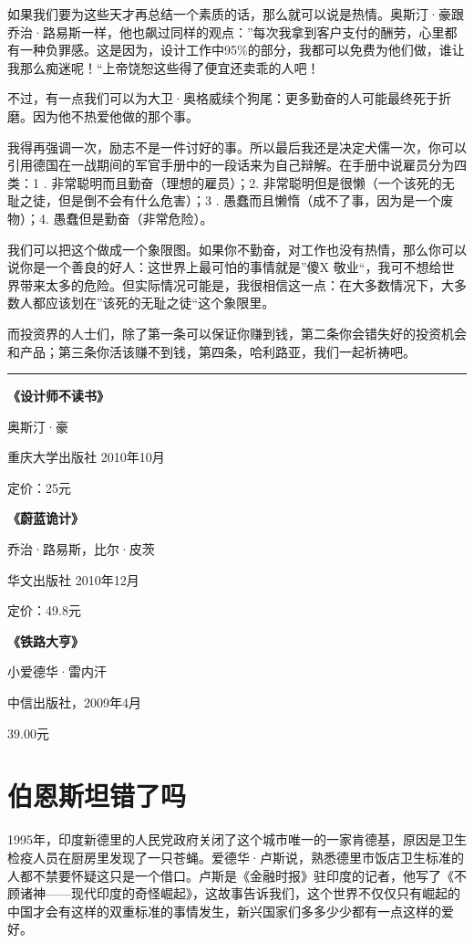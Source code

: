 如果我们要为这些天才再总结一个素质的话，那么就可以说是热情。奥斯汀·豪跟乔治·路易斯一样，他也飙过同样的观点：''每次我拿到客户支付的酬劳，心里都有一种负罪感。这是因为，设计工作中95\%的部分，我都可以免费为他们做，谁让我那么痴迷呢！``上帝饶恕这些得了便宜还卖乖的人吧！

不过，有一点我们可以为大卫·奥格威续个狗尾：更多勤奋的人可能最终死于折磨。因为他不热爱他做的那个事。

我得再强调一次，励志不是一件讨好的事。所以最后我还是决定犬儒一次，你可以引用德国在一战期间的军官手册中的一段话来为自己辩解。在手册中说雇员分为四类：1
. 非常聪明而且勤奋（理想的雇员）；2.
非常聪明但是很懒（一个该死的无耻之徒，但是倒不会有什么危害）；3 .
愚蠢而且懒惰（成不了事，因为是一个废物）；4. 愚蠢但是勤奋（非常危险）。

我们可以把这个做成一个象限图。如果你不勤奋，对工作也没有热情，那么你可以说你是一个善良的好人：这世界上最可怕的事情就是''傻X
敬业``，我可不想给世界带来太多的危险。但实际情况可能是，我很相信这一点：在大多数情况下，大多数人都应该划在''该死的无耻之徒``这个象限里。

而投资界的人士们，除了第一条可以保证你赚到钱，第二条你会错失好的投资机会和产品；第三条你活该赚不到钱，第四条，哈利路亚，我们一起祈祷吧。

\begin{center}\rule{0.5\linewidth}{0.5pt}\end{center}

\textbf{《设计师不读书》}

奥斯汀·豪

重庆大学出版社 2010年10月

定价：25元

\textbf{《蔚蓝诡计》}

乔治·路易斯，比尔·皮茨

华文出版社 2010年12月

定价：49.8元

\textbf{《铁路大亨》}

小爱德华·雷内汗

中信出版社，2009年4月

39.00元

\hypertarget{ux4f2fux6069ux65afux5766ux9519ux4e86ux5417}{%
\section{伯恩斯坦错了吗}\label{ux4f2fux6069ux65afux5766ux9519ux4e86ux5417}}

1995年，印度新德里的人民党政府关闭了这个城市唯一的一家肯德基，原因是卫生检疫人员在厨房里发现了一只苍蝇。爱德华·卢斯说，熟悉德里市饭店卫生标准的人都不禁要怀疑这只是一个借口。卢斯是《金融时报》驻印度的记者，他写了《不顾诸神------现代印度的奇怪崛起》，这故事告诉我们，这个世界不仅仅只有崛起的中国才会有这样的双重标准的事情发生，新兴国家们多多少少都有一点这样的爱好。

